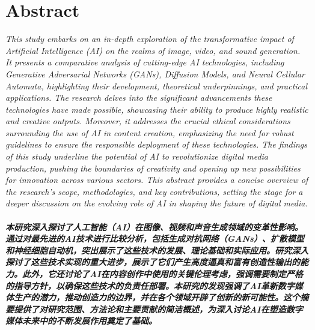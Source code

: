 \documentclass[11pt,a4paper,oneside]{report}
\newcommand{\instructions}[1]{{\color{black}\itshape #1}}
\begin{document}

\clearpage
{}


\setcounter{tocdepth}{1} %
\tableofcontents


\chapter*{Abstract}


\instructions{This study embarks on an in-depth exploration of the transformative impact of Artificial Intelligence (AI) on the realms of image, video, and sound generation. It presents a comparative analysis of cutting-edge AI technologies, including Generative Adversarial Networks (GANs), Diffusion Models, and Neural Cellular Automata, highlighting their development, theoretical underpinnings, and practical applications. The research delves into the significant advancements these technologies have made possible, showcasing their ability to produce highly realistic and creative outputs. Moreover, it addresses the crucial ethical considerations surrounding the use of AI in content creation, emphasizing the need for robust guidelines to ensure the responsible deployment of these technologies. The findings of this study underline the potential of AI to revolutionize digital media production, pushing the boundaries of creativity and opening up new possibilities for innovation across various sectors. This abstract provides a concise overview of the research's scope, methodologies, and key contributions, setting the stage for a deeper discussion on the evolving role of AI in shaping the future of digital media.}

\vspace{4\bigskipamount}


\paragraph{\textnormal{本研究深入探讨了人工智能（AI）在图像、视频和声音生成领域的变革性影响。通过对最先进的AI技术进行比较分析，包括生成对抗网络（GANs）、扩散模型和神经细胞自动机，突出展示了这些技术的发展、理论基础和实际应用。研究深入探讨了这些技术实现的重大进步，展示了它们产生高度逼真和富有创造性输出的能力。此外，它还讨论了AI在内容创作中使用的关键伦理考虑，强调需要制定严格的指导方针，以确保这些技术的负责任部署。本研究的发现强调了AI革新数字媒体生产的潜力，推动创造力的边界，并在各个领域开辟了创新的新可能性。这个摘要提供了对研究范围、方法论和主要贡献的简洁概述，为深入讨论AI在塑造数字媒体未来中的不断发展作用奠定了基础。}}
\end{document}
